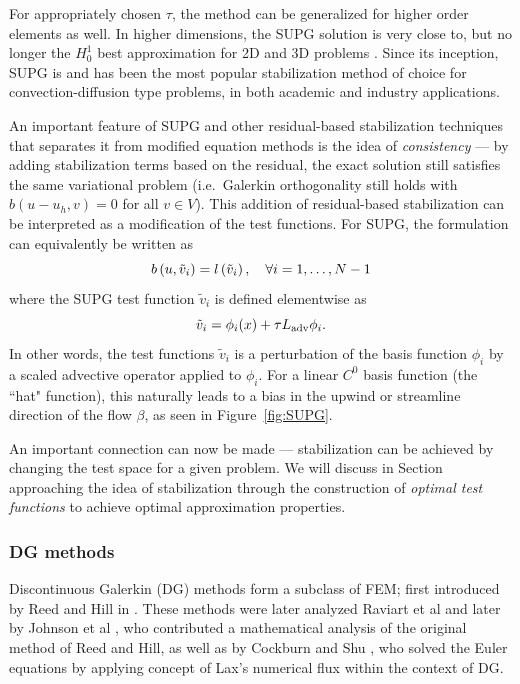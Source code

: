 For appropriately chosen $\tau$, the method can be generalized for higher order elements as well.  In higher dimensions, the SUPG solution is very close to, but no longer the $H^1_0$ best approximation for 2D and 3D problems \cite{HughesSangalliSUPG}.  Since its inception, SUPG is and has been the most popular stabilization method of choice for convection-diffusion type problems, in both academic and industry applications. 

An important feature of SUPG and other residual-based stabilization techniques that separates it from modified equation methods is the idea of \textit{consistency} --- by adding stabilization terms based on the residual, the exact solution still satisfies the same variational problem (i.e.\ Galerkin orthogonality still holds with $b(u-u_h,v) = 0$ for all $v\in V$). This addition of residual-based stabilization can be interpreted as a modification of the test functions.  For SUPG, the formulation can equivalently be written as
\[
b\LRp{u,\tilde{v}_{i}} = l\LRp{\tilde{v}_{i}}, \quad \forall i = 1,\ldots,N-1
\]
where the SUPG test function $\tilde{v}_{i}$ is defined elementwise as
\[
\tilde{v}_{i} = \phi_i(x) + \tau L_{\rm adv} \phi_i.  
\]
In other words, the test functions $\tilde{v}_{i}$ is a perturbation of the basis function $\phi_i$ by a scaled advective operator applied to $\phi_i$.  For a linear $C^0$ basis function (the ``hat" function), this naturally leads to a bias in the upwind or streamline direction of the flow $\beta$, as seen in Figure~\ref{fig:SUPG}.  

An important connection can now be made --- stabilization can be achieved by changing the test space for a given problem.  We will discuss in Section~ approaching the idea of stabilization through the construction of \textit{optimal test functions} to achieve optimal approximation properties. 

\subsubsection{DG methods}

Discontinuous Galerkin (DG) methods form a subclass of FEM; first introduced by Reed and Hill in \cite{Reed:73}. These methods were later analyzed Raviart et al \cite{DGRaviart} and later by Johnson et al \cite{DGJohnson}, who contributed a mathematical analysis of the original method of Reed and Hill, as well as by Cockburn and Shu \cite{CockburnShu:DG}, who solved the Euler equations by applying concept of Lax's numerical flux within the context of DG.

